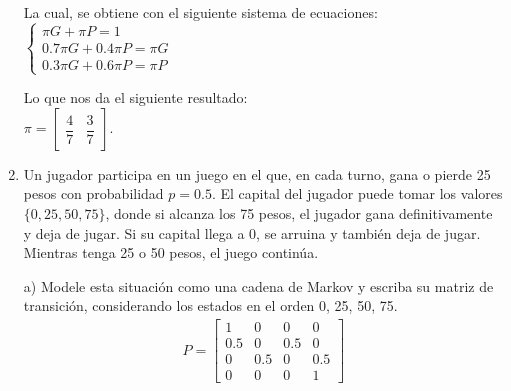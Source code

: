 \documentclass[a4paper, 12pt]{article}
\newcommand{\Aspace}{0.2cm}
\begin{document}
\begin{enumerate}
{                \vspace{\Aspace}
                La cual, se obtiene con el siguiente sistema de ecuaciones: \\
                \(
                    \begin{cases}
                        \pi G + \pi P = 1                   \\
                        0{.}7 \pi G + 0{.}4 \pi P = \pi G   \\
                        0{.}3 \pi G + 0{.}6 \pi P = \pi P
                    \end{cases}
                \)

                \vspace{\Aspace}
                Lo que nos da el siguiente resultado: \\
                \( \pi = 
                    \begin{bmatrix} 
                        \dfrac{4}{7}    &   \dfrac{3}{7}
                    \end{bmatrix} 
                \). \\
            }

        
        \newpage
    \item Un jugador participa en un juego en el que, en cada turno, gana o pierde 25 pesos con probabilidad $p = 0{.}5$. El capital del jugador puede tomar los valores $\{0, 25, 50, 75\}$, donde si alcanza los 75 pesos, el jugador gana definitivamente y deja de jugar. Si su capital llega a 0, se arruina y también deja de jugar. Mientras tenga 25 o 50 pesos, el juego continúa.
            \vspace{\Aspace} \par
            a) Modele esta situación como una cadena de Markov y escriba su matriz de transición, considerando los estados en el orden 0, 25, 50, 75.
            \\ { \color{azul} 
                \[
                    \begin{array}{ccc}
                        P

                        =

                        \begin{bmatrix}
                            1       &   0       &   0       &   0       \\
                            0{.}5   &   0       &   0{.}5   &   0       \\
                            0       &   0{.}5   &   0       &   0{.}5   \\
                            0       &   0       &   0       &   1
                        \end{bmatrix}
                    \end{array}
                \]
            }


\end{enumerate}
\end{document}
